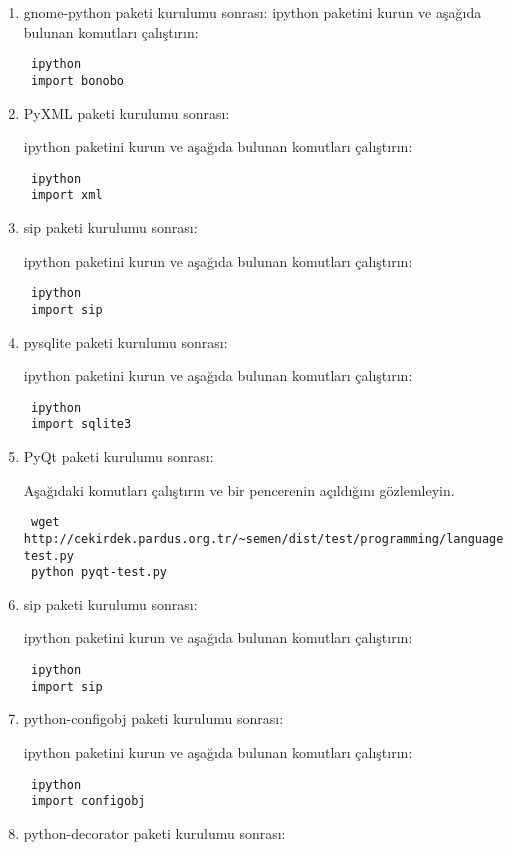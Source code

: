 \documentclass[a4paper,10pt]{article}
\begin{document}
\begin{enumerate}
\item gnome-python paketi kurulumu sonrası:
ipython paketini kurun ve aşağıda bulunan komutları çalıştırın:
\begin{verbatim}
 ipython
 import bonobo
\end{verbatim}


\item PyXML paketi kurulumu sonrası:

ipython paketini kurun ve aşağıda bulunan komutları çalıştırın:
\begin{verbatim}
 ipython
 import xml
\end{verbatim}

\item sip paketi kurulumu sonrası:

ipython paketini kurun ve aşağıda bulunan komutları çalıştırın:
\begin{verbatim}
 ipython
 import sip
\end{verbatim}
\item pysqlite paketi kurulumu sonrası:

ipython paketini kurun ve aşağıda bulunan komutları çalıştırın:
\begin{verbatim}
 ipython
 import sqlite3
\end{verbatim}


\item PyQt paketi kurulumu sonrası:

Aşağıdaki komutları çalıştırın ve bir pencerenin açıldığını gözlemleyin.
\begin{verbatim}
 wget http://cekirdek.pardus.org.tr/~semen/dist/test/programming/language/python/pyqt-test.py
 python pyqt-test.py
\end{verbatim}


\item sip paketi kurulumu sonrası:

ipython paketini kurun ve aşağıda bulunan komutları çalıştırın:
\begin{verbatim}
 ipython
 import sip
\end{verbatim}

\item python-configobj paketi kurulumu sonrası:

ipython paketini kurun ve aşağıda bulunan komutları çalıştırın:
\begin{verbatim}
 ipython
 import configobj
\end{verbatim}
\item python-decorator paketi kurulumu sonrası:


\end{enumerate}
\end{document}
